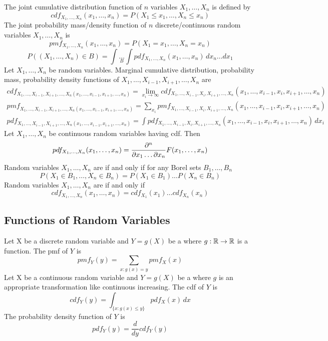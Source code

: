 \documentclass[11pt]{article}
\begin{document}
The joint cumulative distribution function of $n$ variables $X_1, \hdots, X_n$ is defined by
$$cdf_{X_1, \hdots, X_n}(x_1, \hdots, x_n) = P(X_1 \leq x_1, \hdots, X_n \leq x_n)$$
The joint probability mass/density function of $n$ discrete/continuous random variables $X_1, \hdots, X_n$ is 
$$pmf_{X_1,\hdots,X_n}(x_1,\hdots,x_n) = P(X_1 = x_1, \hdots, X_n = x_n)$$
$$P((X_1, \hdots, X_n) \in B) = \int \underset{B}{\hdots}\int pdf_{X_1, \hdots, X_n}(x_1, \hdots, x_n) \,dx_n \hdots dx_1$$
Let $X_1, \hdots, X_n$ be random variables. Marginal cumulative distribution, probability mass, probability density functions of $X_1, \hdots, X_{i-1}, X_{i+1}, \hdots, X_n$ are
\begin{align}
	cdf_{X_1,\hdots,X_{i-1}, X_{i+1}, \hdots, X_n(x_1, \hdots, x_{i-1}, x_{i+1},\hdots, x_n)} = \underset{x_i \rightarrow \infty}{\lim}cdf_{X_1,\hdots,X_{i-1}, X_i, X_{i+1}, \hdots, X_n}(x_1, \hdots, x_{i-1}, x_i, x_{i+1},\hdots, x_n)\\
	pmf_{X_1,\hdots,X_{i-1}, X_{i+1}, \hdots, X_n(x_1, \hdots, x_{i-1}, x_{i+1},\hdots, x_n)} = \sum_{x_i}pmf_{X_1,\hdots,X_{i-1}, X_i, X_{i+1}, \hdots, X_n}(x_1, \hdots, x_{i-1}, x_i, x_{i+1},\hdots, x_n)\\
	pdf_{X_1,\hdots,X_{i-1}, X_{i+1}, \hdots, X_n(x_1, \hdots, x_{i-1}, x_{i+1},\hdots, x_n)} = \int pdf_{X_1,\hdots,X_{i-1}, X_i, X_{i+1}, \hdots, X_n}(x_1, \hdots, x_{i-1}, x_i, x_{i+1},\hdots, x_n) \, dx_i
\end{align}
\theorem
Let $X_1, \hdots, X_n$ be continuous random variables having cdf. Then
$$pdf_{X_1,\hdots,X_n}(x_1, \hdots, x_n) = \frac{\partial^n}{\partial x_1 \hdots \partial x_n}F(x_1,\hdots, x_n)$$
Random variables $X_1, \hdots, X_n$ are  if and only if for any Borel sets $B_1, \hdots, B_n$
$$P(X_1 \in B_1, \hdots, X_n \in B_n) = P(X_1 \in B_1)\hdots P(X_n \in B_n)$$
\theorem
Random variables $X_1, \hdots, X_n$ are  if and only if 
$$cdf_{X_1, \hdots, X_n}(x_1,\hdots,x_n) = cdf_{X_1}(x_1)\hdots cdf_{X_n}(x_n)$$
\subsection{Functions of Random Variables}
\theorem
Let X be a discrete random variable and $Y = g(X)$ be a  where $g: \mathbb{R} \rightarrow \mathbb{R}$ is a function. The pmf of $Y$ is
$$pmf_Y(y) = \sum_{x:g(x) = y}pmf_X(x)$$
\theorem
Let X be a continuous random variable and $Y = g(X)$ be a  where $g$ is an appropriate transformation like continuous increasing. The cdf of $Y$ is
$$cdf_Y(y) = \int_{\{x:g(x) \leq y\}} pdf_X(x) \, dx$$
The probability density function of $Y$ is
$$pdf_Y(y) = \frac{d}{dy} cdf_Y(y)$$
\end{document}
